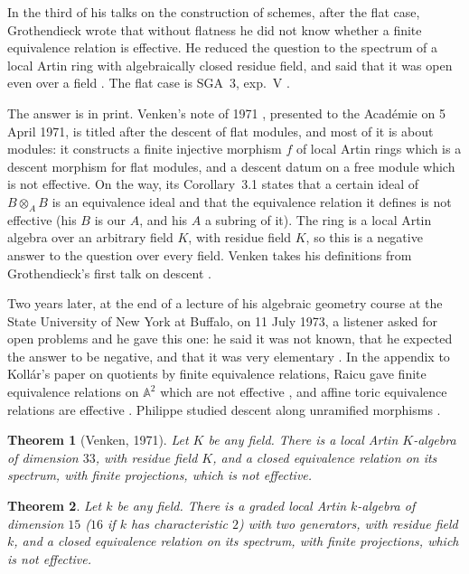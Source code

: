 \documentclass[11pt,a4paper]{amsart}
\newtheorem{theorem}{Theorem}
\theoremstyle{remark}
\newcommand{\A}{\mathbb A}
\begin{document}
In the third of his talks on the construction of schemes, after the flat case, Grothendieck wrote that without flatness he did not know whether a finite equivalence relation is effective. He reduced the question to the spectrum of a local Artin ring with algebraically closed residue field, and said that it was open even over a field \cite[\S2, p.~212-05]{fga3}. The flat case is SGA~3, exp.~V \cite{sga3}.

The answer is in print. Venken's note of 1971 \cite{venken}, presented to the Académie on 5 April 1971, is titled after the descent of flat modules, and most of it is about modules: it constructs a finite injective morphism $f$ of local Artin rings which is a descent morphism for flat modules, and a descent datum on a free module which is not effective. On the way, its Corollary~3.1 states that a certain ideal of $B \otimes_A B$ is an equivalence ideal and that the equivalence relation it defines is not effective (his $B$ is our $A$, and his $A$ a subring of it). The ring is a local Artin algebra over an arbitrary field $K$, with residue field $K$, so this is a negative answer to the question over every field. Venken takes his definitions from Grothendieck's first talk on descent \cite{fga1}.

Two years later, at the end of a lecture of his algebraic geometry course at the State University of New York at Buffalo, on 11 July 1973, a listener asked for open problems and he gave this one: he said it was not known, that he expected the answer to be negative, and that it was very elementary \cite{buffalo}. In the appendix to Kollár's paper on quotients by finite equivalence relations, Raicu gave finite equivalence relations on $\A^2$ which are not effective \cite[\S50]{kollar}, and affine toric equivalence relations are effective \cite{raicu2010}. Philippe studied descent along unramified morphisms \cite{philippe}.

\begin{theorem}[Venken, 1971]\label{thm:venken}
Let $K$ be any field. There is a local Artin $K$-algebra of dimension $33$, with residue field $K$, and a closed equivalence relation on its spectrum, with finite projections, which is not effective.
\end{theorem}

\begin{theorem}\label{thm:main}
Let $k$ be any field. There is a graded local Artin $k$-algebra of dimension $15$ ($16$ if $k$ has characteristic $2$) with two generators, with residue field $k$, and a closed equivalence relation on its spectrum, with finite projections, which is not effective.
\end{theorem}
\end{document}
